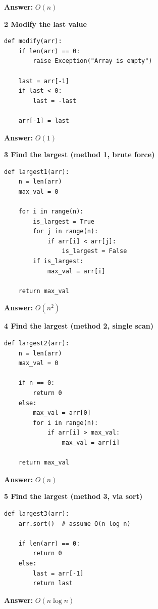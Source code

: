 \textbf{Answer:} $O(n)$

\textbf{2 Modify the last value}

\begin{lstlisting}
def modify(arr):
    if len(arr) == 0:
        raise Exception("Array is empty")

    last = arr[-1]
    if last < 0:
        last = -last

    arr[-1] = last
\end{lstlisting}

\textbf{Answer:} $O(1)$

\textbf{3 Find the largest (method 1, brute force)}

\begin{lstlisting}
def largest1(arr):
    n = len(arr)
    max_val = 0

    for i in range(n):
        is_largest = True
        for j in range(n):
            if arr[i] < arr[j]:
                is_largest = False
        if is_largest:
            max_val = arr[i]

    return max_val
\end{lstlisting}

\textbf{Answer:} $O(n^2)$

\textbf{4 Find the largest (method 2, single scan)}

\begin{lstlisting}
def largest2(arr):
    n = len(arr)
    max_val = 0

    if n == 0:
        return 0
    else:
        max_val = arr[0]
        for i in range(n):
            if arr[i] > max_val:
                max_val = arr[i]

    return max_val
\end{lstlisting}

\textbf{Answer:} $O(n)$

\textbf{5 Find the largest (method 3, via sort)}

\begin{lstlisting}
def largest3(arr):
    arr.sort()  # assume O(n log n)

    if len(arr) == 0:
        return 0
    else:
        last = arr[-1]
        return last
\end{lstlisting}

\textbf{Answer:} $O(n \log n)$

% 
